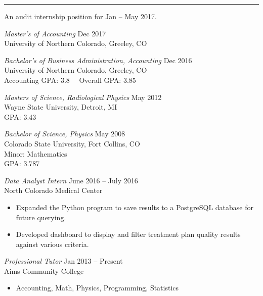 \documentclass{article}
\begin{document}
\vskip2mm
\hrule
{}

\begin{description}[leftmargin=!,labelwidth=3cm]

\item[Objective]
An audit internship position for Jan -- May 2017.

\item[Education]
{\sl Master's of Accounting} \hfill Dec 2017\\
University of Northern Colorado, Greeley, CO

{\sl Bachelor's of Business Administration, Accounting} \hfill Dec 2016\\
University of Northern Colorado, Greeley, CO\\
Accounting GPA: 3.8 \qquad\ \  Overall GPA: 3.85

{\sl Masters of Science, Radiological Physics} \hfill May 2012\\
Wayne State University, Detroit, MI\\
GPA: 3.43

{\sl Bachelor of Science, Physics} \hfill May 2008\\
Colorado State University, Fort Collins, CO \\
Minor: Mathematics\\
GPA: 3.787

\item[Experience]
{\sl Data Analyst Intern} \hfill June 2016 -- July 2016\\North Colorado Medical Center
\begin{itemize}[rightmargin=4.3cm]
    \item Expanded the Python program to save results to a PostgreSQL database for future querying.
    \item Developed dashboard to display and filter treatment plan quality results against various criteria.
\end{itemize}

{\sl Professional Tutor} \hfill Jan 2013 -- Present\\Aims Community College
\begin{itemize}[rightmargin=4.3cm]
    \item Accounting, Math, Physics, Programming, Statistics
\end{itemize}


\end{description}
\end{document}
